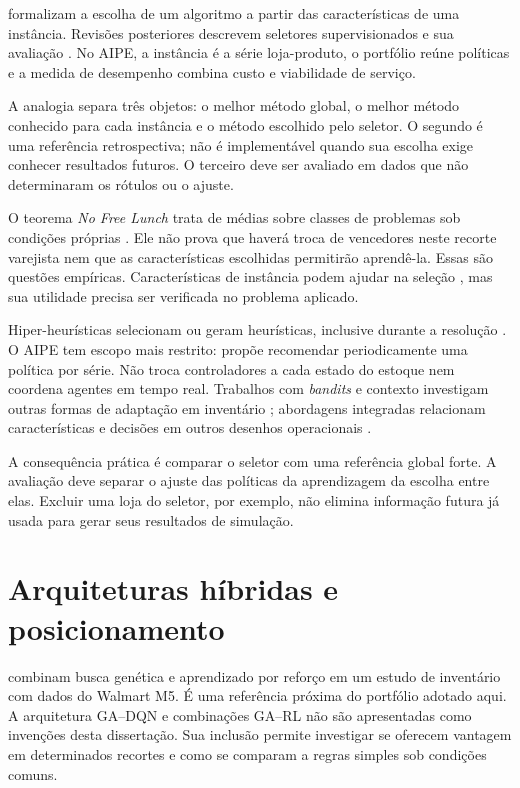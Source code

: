 \citet{Rice1976AlgorithmSelection} formalizam a escolha de um algoritmo a partir das características de uma instância. Revisões posteriores descrevem seletores supervisionados e sua avaliação \citep{Kotthoff2014AlgorithmSelection,Kerschke2019AutomatedAlgorithmSelection}. No AIPE, a instância é a série loja-produto, o portfólio reúne políticas e a medida de desempenho combina custo e viabilidade de serviço.

A analogia separa três objetos: o melhor método global, o melhor método conhecido para cada instância e o método escolhido pelo seletor. O segundo é uma referência retrospectiva; não é implementável quando sua escolha exige conhecer resultados futuros. O terceiro deve ser avaliado em dados que não determinaram os rótulos ou o ajuste.

O teorema \textit{No Free Lunch} trata de médias sobre classes de problemas sob condições próprias \citep{Wolpert1997NoFreeLunch}. Ele não prova que haverá troca de vencedores neste recorte varejista nem que as características escolhidas permitirão aprendê-la. Essas são questões empíricas. Características de instância podem ajudar na seleção \citep{Kerschke2019ELASelection}, mas sua utilidade precisa ser verificada no problema aplicado.

Hiper-heurísticas selecionam ou geram heurísticas, inclusive durante a resolução \citep{Drake2020SelectionHyperHeuristics,Dokeroglu2024HyperHeuristics}. O AIPE tem escopo mais restrito: propõe recomendar periodicamente uma política por série. Não troca controladores a cada estado do estoque nem coordena agentes em tempo real. Trabalhos com \textit{bandits} e contexto investigam outras formas de adaptação em inventário \citep{Preil2022BanditInventory,ContextualRL2024SupplyChain}; abordagens integradas relacionam características e decisões em outros desenhos operacionais \citep{Qi2023EndToEndInventory}.

A consequência prática é comparar o seletor com uma referência global forte. A avaliação deve separar o ajuste das políticas da aprendizagem da escolha entre elas. Excluir uma loja do seletor, por exemplo, não elimina informação futura já usada para gerar seus resultados de simulação.

\section{Arquiteturas híbridas e posicionamento}

\citet{Zabraoui2025GaDQN} combinam busca genética e aprendizado por reforço em um estudo de inventário com dados do Walmart M5. É uma referência próxima do portfólio adotado aqui. A arquitetura GA--DQN e combinações GA--RL não são apresentadas como invenções desta dissertação. Sua inclusão permite investigar se oferecem vantagem em determinados recortes e como se comparam a regras simples sob condições comuns.

